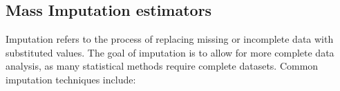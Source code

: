 \documentclass[
]{jss}
\begin{document}
\begin{table}
\centering
\captionsetup{aboveskip=0pt, belowskip=0pt} %
\scriptsize %
\setlength{\tabcolsep}{3pt} %
\renewcommand{\arraystretch}{0.8} %
\caption{Two Sample Setting}
\label{tab:tabela1_1}
\end{table}

\hypertarget{mass-imputation-estimators}{%
\subsection{Mass Imputation
estimators}\label{mass-imputation-estimators}}

Imputation refers to the process of replacing missing or incomplete data
with substituted values. The goal of imputation is to allow for more
complete data analysis, as many statistical methods require complete
datasets. Common imputation techniques include:
\end{document}
